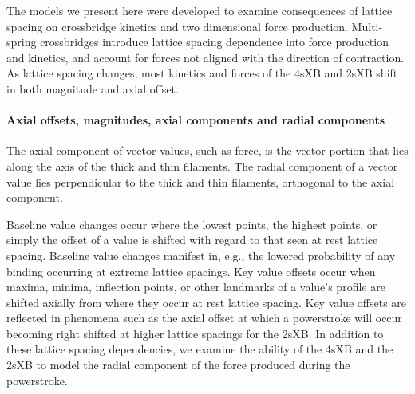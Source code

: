 \documentclass[]{article}
\begin{document}
The models we present here were developed to examine consequences of lattice spacing on crossbridge kinetics and two dimensional force production.
Multi-spring crossbridges introduce lattice spacing dependence into force production and kinetics, and account for forces not aligned with the direction of contraction.
As lattice spacing changes, most kinetics and forces of the 4sXB and 2sXB shift in both magnitude and axial offset.

\paragraph{Axial offsets, magnitudes, axial components and radial components} %
The axial component of vector values, such as force, is the vector portion that lies along the axis of the thick and thin filaments.
The radial component of a vector value lies perpendicular to the thick and thin filaments, orthogonal to the axial component.

Baseline value changes occur where the lowest points, the highest points, or simply the offset of a value is shifted with regard to that seen at rest lattice spacing.
Baseline value changes manifest in, e.g., the lowered probability of any binding occurring at extreme lattice spacings. 
Key value offsets occur when maxima, minima, inflection points, or other landmarks of a value's profile are shifted axially from where they occur at rest lattice spacing.
Key value offsets are reflected in phenomena such as the axial offset at which a powerstroke will occur becoming right shifted at higher lattice spacings for the 2sXB.
In addition to these lattice spacing dependencies, we examine the ability of the 4sXB and the 2sXB to model the radial component of the force produced during the powerstroke.
\end{document}
